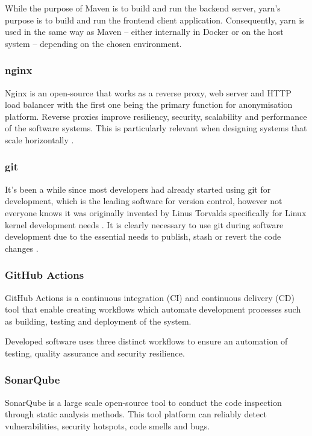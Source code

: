 \documentclass[a4paper,twoside,12pt]{book}
\begin{document}
While the purpose of Maven is to build and run the backend server, yarn's purpose is to build and run the frontend client application. Consequently, yarn is used in the same way as Maven – either internally in Docker or on the host system – depending on the chosen environment.

\subsubsection{nginx}

Nginx is an open-source that works as a reverse proxy, web server and HTTP load balancer with the first one being the primary function for anonymisation platform. Reverse proxies improve resiliency, security, scalability and performance of the software systems. This is particularly relevant when designing systems that scale horizontally \cite{bib:nginx_cookbook}.

\subsubsection{git}

It's been a while since most developers had already started using git for development, which is the leading software for version control, however not everyone knows it was originally invented by Linus Torvalds specifically for Linux kernel development needs \cite{bib:git_techtalk}. It is clearly necessary to use git during software development due to the essential needs to publish, stash or revert the code changes \cite{bib:git_pro}.

\subsubsection{GitHub Actions}

GitHub Actions is a continuous integration (CI) and continuous delivery (CD) tool that enable creating workflows which automate development processes such as building, testing and deployment of the system.

Developed software uses three distinct workflows to ensure an automation of testing, quality assurance and security resilience.

\subsubsection{SonarQube}

SonarQube is a large scale open-source tool to conduct the code inspection through static analysis methods. This tool platform can reliably detect vulnerabilities, security hotspots, code smells and bugs. 
\end{document}
